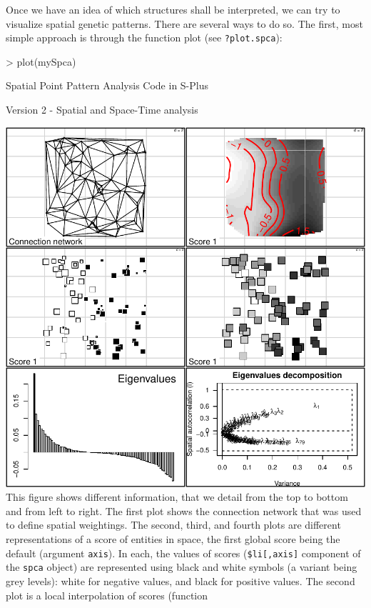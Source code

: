 \documentclass{article}
\begin{document}
Once we have an idea of which structures shall be interpreted, we can
try to visualize spatial genetic patterns.
There are several ways to do so.
The first, most simple approach is through the function plot (see \texttt{?plot.spca}):
\begin{Schunk}
\begin{Sinput}
> plot(mySpca)
\end{Sinput}
\begin{Soutput}
Spatial Point Pattern Analysis Code in S-Plus

 Version 2 - Spatial and Space-Time analysis
\end{Soutput}
\end{Schunk}
\includegraphics{figs/spca-plotspca}
\noindent This figure shows different information, that we detail from
the top to bottom and from left to right.
The first plot shows the connection network that was used to define
spatial weightings.
The second, third, and fourth plots are different representations of
a score of entities in space, the first global score being the default (argument
\texttt{axis}).
In each, the values of scores (\texttt{\$li[,axis]} component of the
\texttt{spca} object) are represented using black and white symbols
(a variant being grey levels): white for negative values, and black
for positive values.
The second plot is a local interpolation of scores (function
\end{document}
